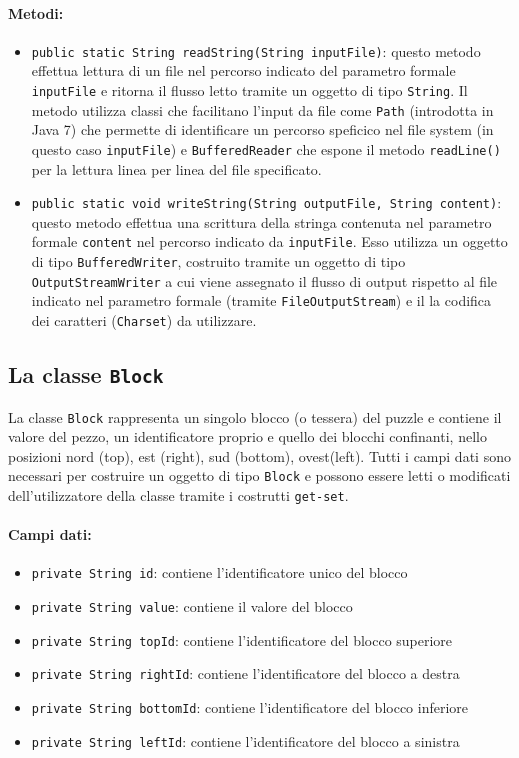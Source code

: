 \paragraph{Metodi:}
\begin{itemize}
\item \texttt{public static String readString(String inputFile)}: questo metodo effettua lettura di un file nel percorso indicato del parametro formale \texttt{inputFile} e ritorna il flusso letto tramite un oggetto di tipo \texttt{String}. Il metodo utilizza classi che facilitano l'input da file come \texttt{Path} (introdotta in Java 7) che permette di identificare un percorso speficico nel file system (in questo caso \texttt{inputFile}) e \texttt{BufferedReader} che espone il metodo \texttt{readLine()} per la lettura linea per linea del file specificato. 

\item \texttt{public static void writeString(String outputFile, String content)}: questo metodo effettua una scrittura della stringa contenuta nel parametro formale \texttt{content} nel percorso indicato da \texttt{inputFile}. Esso utilizza un oggetto di tipo \texttt{BufferedWriter}, costruito tramite un oggetto di tipo \texttt{OutputStreamWriter} a cui viene assegnato il flusso di output rispetto al file indicato nel parametro formale (tramite \texttt{FileOutputStream}) e il la codifica dei caratteri (\texttt{Charset}) da utilizzare.
\end{itemize}

\subsection{La classe \texttt{Block}}
La classe \texttt{Block} rappresenta un singolo blocco (o tessera) del puzzle e contiene il valore del pezzo, un identificatore proprio e quello dei blocchi confinanti, nello posizioni nord (top), est (right), sud (bottom), ovest(left).
Tutti i campi dati sono necessari per costruire un oggetto di tipo \texttt{Block} e possono essere letti o modificati dell'utilizzatore della classe tramite i costrutti \texttt{get-set}.
\newpage

\paragraph{Campi dati:}
\begin{itemize}
\item \texttt{private String id}: contiene l'identificatore unico del blocco
\item \texttt{private String value}: contiene il valore del blocco
\item \texttt{private String topId}: contiene l'identificatore del blocco superiore
\item \texttt{private String rightId}: contiene l'identificatore del blocco a destra
\item \texttt{private String bottomId}: contiene l'identificatore del blocco inferiore
\item \texttt{private String leftId}: contiene l'identificatore del blocco a sinistra
\end{itemize} 

